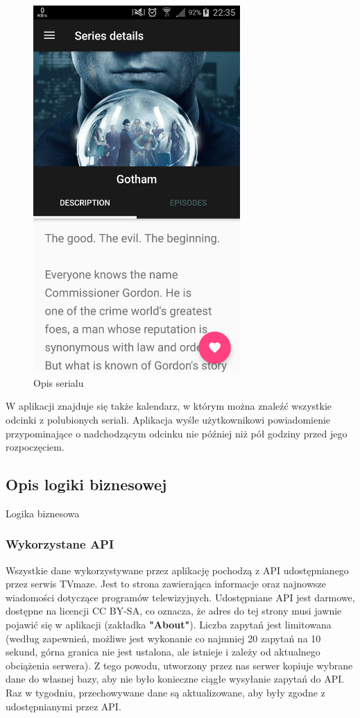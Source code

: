 \documentclass[10pt,a4paper]{article}
\begin{document}
\begin{figure}[H]
	\centering
	\includegraphics[height=14cm]{Resources/Images/details.png}
	\caption{Opis serialu}
\end{figure}
\noindent
W aplikacji znajduje się także kalendarz, w którym można znaleźć wszystkie odcinki z polubionych seriali. Aplikacja wyśle użytkownikowi powiadomienie przypominające o nadchodzącym odcinku nie później niż pół godziny przed jego rozpoczęciem.

\newpage
\subsection{Opis logiki biznesowej}
Logika biznesowa

\subsubsection{Wykorzystane API}
Wszystkie dane wykorzystywane przez aplikację pochodzą z API udostępnianego przez serwis TVmaze. Jest to strona zawierająca informacje oraz najnowsze wiadomości dotyczące programów telewizyjnych. Udostępniane API jest darmowe, dostępne na licencji CC BY-SA, co oznacza, że adres do tej strony musi jawnie pojawić się w aplikacji (zakładka \textbf{"About"}). Liczba zapytań jest limitowana (według zapewnień, możliwe jest wykonanie co najmniej 20 zapytań na 10 sekund, górna granica nie jest ustalona, ale istnieje i zależy od aktualnego obciążenia serwera). Z tego powodu, utworzony przez nas serwer kopiuje wybrane dane do własnej bazy, aby nie było konieczne ciągłe wysyłanie zapytań do API. Raz w tygodniu, przechowywane dane są aktualizowane, aby były zgodne z udostępnianymi przez API.
\end{document}

